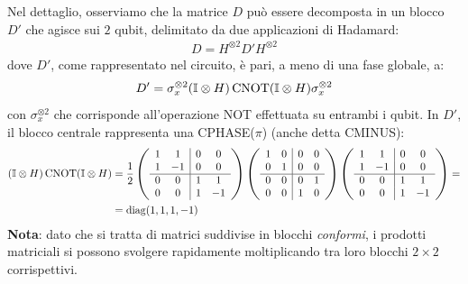 \documentclass[../../InformazioneQuantistica.tex]{subfiles}
\begin{document}
Nel dettaglio, osserviamo che la matrice $D$ può essere decomposta in un blocco $D'$ che agisce sui $2$ qubit, delimitato da due applicazioni di Hadamard:
\begin{align*}
D = H^{\otimes 2} D' H^{\otimes 2}
\end{align*}
dove $D'$, come rappresentato nel circuito, è pari, a meno di una fase globale, a:
\begin{align*}
    D' = \sigma_x^{\otimes 2} (\mathbb{I} \otimes H) \operatorname{CNOT} (\mathbb{I} \otimes H) \sigma_x^{\otimes 2}
\end{align*}
con $\sigma_x^{\otimes 2}$ che corrisponde all'operazione NOT effettuata su entrambi i qubit. In $D'$, il blocco centrale rappresenta una CPHASE($\pi$) (anche detta CMINUS):
\begin{align*}
    (\mathbb{I}\otimes H) \operatorname{CNOT} (\mathbb{I} \otimes H) &= \frac{1}{2}
    \left (\begin{array}{cc|cc}
        1 & 1 & 0 & 0\\
        1 & -1 & 0 & 0 \\ \hline
        0 & 0 & 1 & 1\\
        0 & 0 & 1 & -1
    \end{array} \right) 
    \left (\begin{array}{cc|cc}
        1 & 0 & 0 & 0\\
        0 & 1 & 0 & 0\\ \hline
        0 & 0 & 0 & 1 \\
        0 & 0 & 1 & 0
    \end{array} \right) 
    \left (\begin{array}{cc|cc}
        1 & 1 & 0 & 0\\
        1 & -1 & 0 & 0 \\ \hline
        0 & 0 & 1 & 1\\
        0 & 0 & 1 & -1
    \end{array} \right) = \\
    &= \operatorname{diag}(1,1,1,-1)
\end{align*}
\textbf{Nota}: dato che si tratta di matrici suddivise in blocchi \textit{conformi}, i prodotti matriciali si possono svolgere rapidamente moltiplicando tra loro blocchi $2\times 2$ corrispettivi.\\
\end{document}

